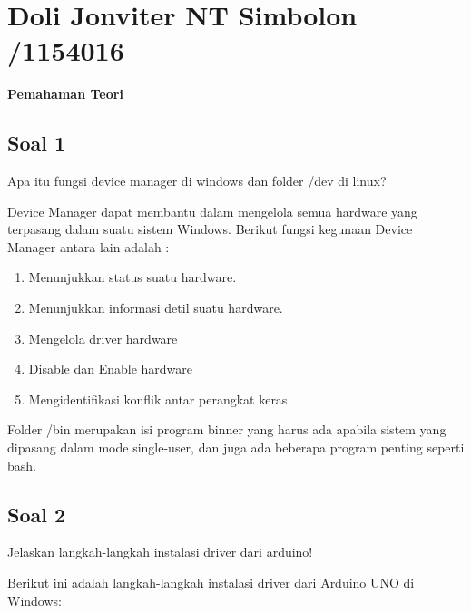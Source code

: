 \section{Doli Jonviter NT Simbolon /1154016}
{\Large \textbf{Pemahaman Teori}}
\subsection{Soal 1}
Apa itu fungsi device manager di windows dan folder /dev di linux?

\hfill \break
Device Manager  dapat  membantu dalam mengelola  semua hardware yang terpasang  dalam suatu sistem Windows. 
 Berikut fungsi kegunaan Device Manager antara lain adalah :
\begin{enumerate}
	\item Menunjukkan status suatu hardware.
	\item Menunjukkan informasi detil suatu hardware.
	\item Mengelola driver hardware
	\item Disable dan Enable hardware
	\item Mengidentifikasi konflik antar perangkat keras.
\end{enumerate}

\hfill \break
Folder /bin merupakan isi program binner yang harus ada apabila sistem yang dipasang dalam mode single-user, dan juga  ada beberapa program penting seperti bash.

\subsection{Soal 2}
Jelaskan langkah-langkah instalasi driver dari arduino!

\hfill \break
Berikut ini adalah langkah-langkah instalasi driver dari Arduino UNO di Windows:

